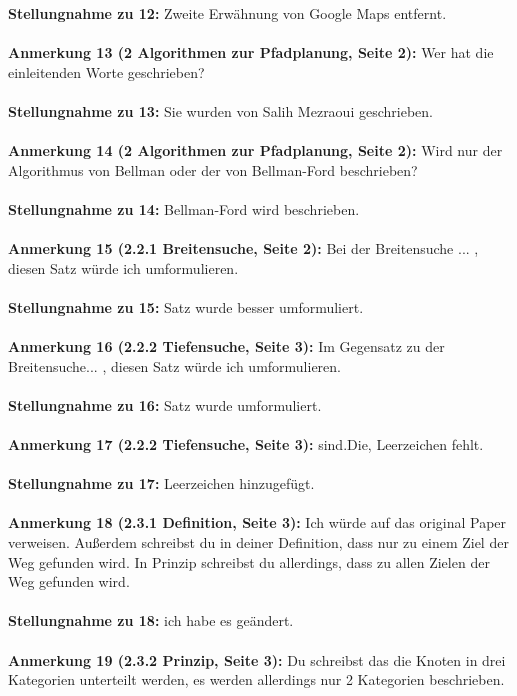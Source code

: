 \documentclass[a4paper,12pt]{book}
\begin{document}
\textbf{Stellungnahme zu 12:}
Zweite Erwähnung von Google Maps entfernt.
\\ \\
\textbf{Anmerkung 13 (2 Algorithmen zur Pfadplanung, Seite 2):}
Wer hat die einleitenden Worte geschrieben?
 \\  \\
\textbf{Stellungnahme zu 13:} Sie wurden von Salih Mezraoui geschrieben.
\\ \\
\textbf{Anmerkung 14 (2 Algorithmen zur Pfadplanung, Seite 2):}
Wird nur der Algorithmus von Bellman oder der von Bellman-Ford beschrieben?
 \\  \\
\textbf{Stellungnahme zu 14:} Bellman-Ford wird beschrieben.
\\ \\
\textbf{Anmerkung 15 (2.2.1 Breitensuche, Seite 2):}
\grqq Bei der Breitensuche ... \glqq, diesen Satz würde ich umformulieren.
\\ \\
\textbf{Stellungnahme zu 15:}
Satz wurde besser umformuliert.
\\ \\
\textbf{Anmerkung 16 (2.2.2 Tiefensuche, Seite 3):}
\grqq Im Gegensatz zu der Breitensuche... \glqq, diesen Satz würde ich umformulieren.
\\ \\
\textbf{Stellungnahme zu 16:}
Satz wurde umformuliert.
\\ \\
\textbf{Anmerkung 17 (2.2.2 Tiefensuche, Seite 3):}
\grqq sind.Die\grqq, Leerzeichen fehlt.
\\ \\
\textbf{Stellungnahme zu 17:}
Leerzeichen hinzugefügt.
\\ \\
\textbf{Anmerkung 18 (2.3.1 Definition, Seite 3):}
Ich würde auf das original Paper verweisen. Außerdem schreibst du in deiner Definition, dass nur zu einem Ziel der Weg gefunden wird. In Prinzip schreibst du allerdings, dass zu allen Zielen der Weg gefunden wird. 
 \\  \\
\textbf{Stellungnahme zu 18:} ich habe es geändert.
\\ \\
\textbf{Anmerkung 19 (2.3.2 Prinzip, Seite 3):}
Du schreibst das die Knoten in drei Kategorien unterteilt werden, es werden allerdings nur 2 Kategorien beschrieben.
 \\  \\
\end{document}
